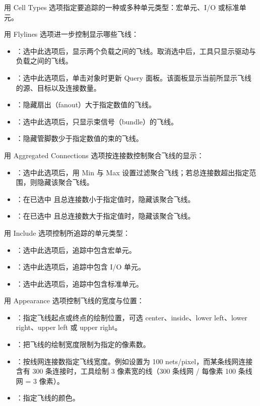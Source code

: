 用 Cell Types 选项指定要追踪的一种或多种单元类型：宏单元、I/O 或标准单元。

用 Flylines 选项进一步控制显示哪些飞线：
\begin{itemize}
  \item {}：选中此选项后，显示两个负载之间的飞线。取消选中后，工具只显示驱动与负载之间的飞线。
  \item {}：选中此选项后，单击对象时更新 Query 面板。该面板显示当前所显示飞线的源、目标以及连接数量。
  \item {}：隐藏扇出（fanout）大于指定数值的飞线。
  \item {}：选中此选项后，只显示束信号（bundle）的飞线。
  \item {}：隐藏管脚数少于指定数值的束的飞线。
\end{itemize}

用 Aggregated Connections 选项按连接数控制聚合飞线的显示：
\begin{itemize}
  \item {}：选中此选项后，用 Min 与 Max 设置过滤聚合飞线；若总连接数超出指定范围，则隐藏该聚合飞线。
  \item {}：在已选中  且总连接数小于指定值时，隐藏该聚合飞线。
  \item {}：在已选中  且总连接数大于指定值时，隐藏该聚合飞线。
\end{itemize}

用 Include 选项控制所追踪的单元类型：
\begin{itemize}
  \item {}：选中此选项后，追踪中包含宏单元。
  \item {}：选中此选项后，追踪中包含 I/O 单元。
  \item {}：选中此选项后，追踪中包含标准单元。
\end{itemize}

用 Appearance 选项控制飞线的宽度与位置：
\begin{itemize}
  \item {}：指定飞线起点或终点的绘制位置，可选 center、inside、lower left、lower right、upper left 或 upper right。
  \item {}：把飞线的绘制宽度限制为指定的像素数。
  \item {}：按线网连接数指定飞线宽度。例如设置为 100 nets/pixel，而某条线网连接含有 300 条连接时，工具绘制 3 像素宽的线（300 条线网 / 每像素 100 条线网 = 3 像素）。
  \item {}：指定飞线的颜色。
\end{itemize}

